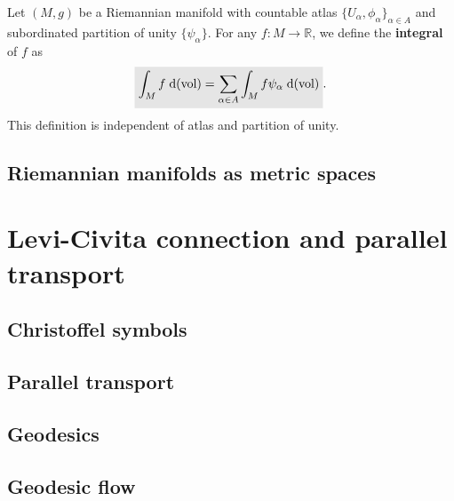 \documentclass[letter-paper]{tufte-book}
\newcommand{\highlight}[1]{\mathchoice%
  {\colorbox{black!10}{$\displaystyle#1$}}%
  {\colorbox{black!10}{$\textstyle#1$}}%
  {\colorbox{black!10}{$\scriptstyle#1$}}%
  {\colorbox{black!10}{$\scriptscriptstyle#1$}}}%
\begin{document}
Let $(M,g)$ be a Riemannian manifold with countable atlas $\{U_\alpha, \phi_\alpha\}_{\alpha \in A}$ and subordinated partition of unity $\{\psi_\alpha\}$. For any $f: M\to \mathbb{R}$, we define the \textbf{integral} of $f$ as
\begin{equation}
  \highlight{\int_M f\; \mathrm{d}(\mbox{vol}) = \sum_{\alpha \in A} \int_M f\psi_\alpha\; \mathrm{d}(\mbox{vol})}.
\end{equation}
This definition is independent of atlas and partition of unity.


\section{Riemannian manifolds as metric spaces}


\chapter{Levi-Civita connection and parallel transport}


\section{Christoffel symbols}


\section{Parallel transport}


\section{Geodesics}


\section{Geodesic flow}
\end{document}
